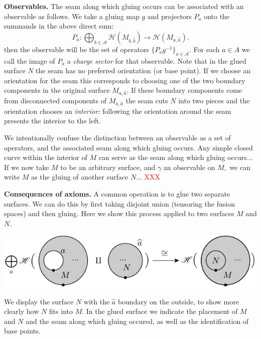 \documentclass[aps, prl, letterpaper, twocolumn, superscriptaddress, notitlepage, 10pt]{revtex4-1}
\newcommand{\simon}[1]{\textcolor{red}{#1}}
\newcommand{\F}{\mathscr{H}} %
\newcommand{\A}{\mathcal{A}}
\newcommand{\subsub}[1]{{\bf #1}}
\begin{document}
\subsub{Observables.}
The seam along which gluing occurs can be associated
with an observable as follows.
We take a gluing map $g$ and projectors $P_a$ onto the
summands in the above direct sum:
$$
    P_a: \bigoplus_{b\in\A} \F(M_{b,\widehat{b}}) \to \F(M_{a,\widehat{a}}).
$$
then the observable will be the set of operators 
$\{P_a g^{-1}\}_{a\in\A}.$
For each $a\in A$
we call the image of $P_a$ 
a \emph{charge sector} for that observable.
Note that in the glued surface $N$ the seam has no
preferred orientation (or base point).
If we choose an orientation 
for the seam this corresponds to choosing one of the
two boundary components in the original surface $M_{a,\widehat{a}}.$
If these boundary components come from disconnected components of 
$M_{a,\widehat{a}}$ the seam cuts $N$ into two pieces and the
orientation chooses an \emph{interior:}
following the orientation around the seam presents
the interior to the left.

We intentionally confuse the distinction between an
observable as a set of operators,
and the associated seam along which gluing occurs.
Any simple closed curve within the interior of $M$
can serve as the seam along which gluing occurs...
If we now take $M$ to be an arbitrary surface, and $\gamma$ an
observable on $M,$
we can write $M$ as the gluing of another surface $N$...
\simon{XXX}

\subsub{Consequences of axioms.}
A common operation is to glue two separate surfaces.
We can do this by first taking disjoint union (tensoring
the fusion spaces)
and then gluing.
Here we show this process applied to two surfaces $M$ and $N$. 
\begin{center}
\includegraphics[]{pic-glue.pdf}
\end{center}
We display the surface $N$ with the $\widehat{a}$
boundary on the outside, 
to show more clearly how $N$ fits into $M$.
In the glued surface we
indicate the placement of $M$ and $N$ and the seam
along which gluing occured,
as well as the identification of base points.
\end{document}
